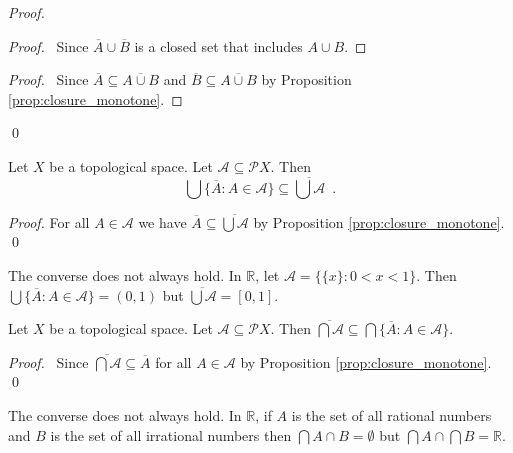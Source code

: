 \begin{proof}
\pf
{}
\begin{proof}
\pf\ Since $\overline{A} \cup \overline{B}$ is a closed set that includes $A \cup B$.
\end{proof}
\begin{proof}
	\pf\ Since $\overline{A} \subseteq \overline{A \cup B}$ and $\overline{B} \subseteq \overline{A \cup B}$ by Proposition \ref{prop:closure_monotone}.
\end{proof}
\qed
\end{proof}

\begin{prop}
Let $X$ be a topological space. Let $\mathcal{A} \subseteq \mathcal{P} X$. Then
\[ \bigcup \{ \overline{A} : A \in \mathcal{A} \} \subseteq \overline{\bigcup \mathcal{A}} \enspace . \]
\end{prop}

\begin{proof}
\pf
For all $A \in \mathcal{A}$ we have $\overline{A} \subseteq \overline{\bigcup \mathcal{A}}$ by Proposition \ref{prop:closure_monotone}. \qed
\end{proof}

\begin{ex}
The converse does not always hold. In $\mathbb{R}$, let $\mathcal{A} = \{ \{ x \} : 0 < x < 1 \}$. Then $\bigcup \{ \overline{A} : A \in \mathcal{A} \} = (0,1)$ but $\overline{\bigcup \mathcal{A}} = [0,1]$.
\end{ex}

\begin{prop}
Let $X$ be a topological space. Let $\mathcal{A} \subseteq \mathcal{P} X$. Then $\overline{\bigcap \mathcal{A}} \subseteq \bigcap \{ \overline{A} : A \in \mathcal{A} \}$.
\end{prop}

\begin{proof}
\pf\ Since $\overline{\bigcap \mathcal{A}} \subseteq \overline{A}$ for all $A \in \mathcal{A}$ by Proposition \ref{prop:closure_monotone}. \qed
\end{proof}

\begin{ex}
The converse does not always hold. In $\mathbb{R}$, if $A$ is the set of all rational numbers and $B$ is the set of all irrational numbers then $\bigcap{A \cap B} = \emptyset$ but $\bigcap{A} \cap \bigcap{B} = \mathbb{R}$.
\end{ex}

